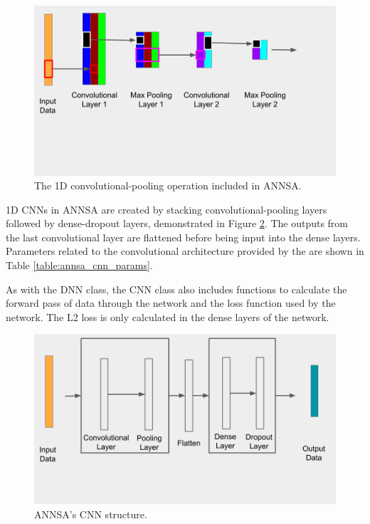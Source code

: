 \begin{figure}[H]
\centering
\includegraphics[trim=0 150 60 0,clip,width=0.8\linewidth]{images/annsa_cnn_fine.png}
\caption{The 1D convolutional-pooling operation included in ANNSA.}
\label{fig:annsa_cnn_fine}
\end{figure}

1D CNNs in ANNSA are created by stacking convolutional-pooling layers followed by dense-dropout layers, demonstrated in Figure \ref{fig:annsa_cnn}. The outputs from the last convolutional layer are flattened before being input into the dense layers. Parameters related to the convolutional architecture provided by the are shown in Table \ref{table:annsa_cnn_params}. 

As with the DNN class, the CNN class also includes functions to calculate the forward pass of data through the network and the loss function used by the network. The L2 loss is only calculated in the dense layers of the network.

\begin{figure}[H]
\centering
\includegraphics[trim=0 75 20 0,clip,width=0.8\linewidth]{images/annsa_cnn.png}
\caption{ANNSA's CNN structure.}
\label{fig:annsa_cnn}
\end{figure}

